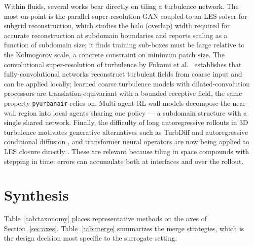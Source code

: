 \documentclass[11pt]{article}
\begin{document}
Within fluids, several works bear directly on tiling a turbulence network. The
most on-point is the parallel super-resolution GAN coupled to an LES solver for
subgrid reconstruction, which studies the halo (overlap) width required for
accurate reconstruction at subdomain boundaries and reports scaling as a function
of subdomain size; it finds training sub-boxes must be large relative to the
Kolmogorov scale, a concrete constraint on minimum patch size. The convolutional
super-resolution of turbulence by Fukami et al.\
\cite{fukami2019superresolution,fukami2021spatiotemporal} establishes that
fully-convolutional networks reconstruct turbulent fields from coarse input and
can be applied locally; learned coarse turbulence models with dilated-convolution
processors \cite{stachenfeld2022coarse} are translation-equivariant with a
bounded receptive field, the same property \texttt{pyurbanair} relies on.
Multi-agent RL wall models \cite{bae2022scimarl} decompose the near-wall region
into local agents sharing one policy --- a subdomain structure with a single
shared network. Finally, the difficulty of long autoregressive rollouts in 3D
turbulence motivates generative alternatives such as TurbDiff
\cite{lienen2024turbdiff} and autoregressive conditional diffusion
\cite{kohl2023benchmarking}, and transformer neural operators are now being
applied to LES closure directly \cite{li2024tno}. These are relevant because
tiling in space compounds with stepping in time: errors can accumulate both at
interfaces and over the rollout.

\section{Synthesis}\label{sec:synthesis}

Table~\ref{tab:taxonomy} places representative methods on the axes of
Section~\ref{sec:axes}. Table~\ref{tab:merge} summarizes the merge strategies,
which is the design decision most specific to the surrogate setting.
\end{document}
